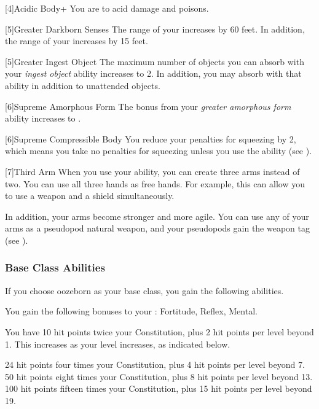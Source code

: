             [4]{Acidic Body+} You are  to acid damage and poisons.

            [5]{Greater Darkborn Senses} The range of your  increases by 60 feet.
            In addition, the range of your  increases by 15 feet.

            [5]{Greater Ingest Object} The maximum number of objects you can absorb with your \textit{ingest object} ability increases to 2.
            In addition, you may absorb  with that ability in addition to unattended objects.

            [6]{Supreme Amorphous Form} The bonus from your \textit{greater amorphous form} ability increases to .

            [6]{Supreme Compressible Body} You reduce your penalties for squeezing by 2, which means you take no penalties for squeezing unless you use the  ability (see ).

            [7]{Third Arm} When you use your  ability, you can create three arms instead of two.
            You can use all three hands as free hands.
            For example, this can allow you to use a  weapon and a shield simultaneously.

            In addition, your arms become stronger and more agile.
            You can use any of your arms as a pseudopod natural weapon, and your pseudopods gain the  weapon tag (see ).

        \subsubsection{Base Class Abilities}
            If you choose oozeborn as your base class, you gain the following abilities.

            You gain the following bonuses to your :  Fortitude,  Reflex,  Mental.

                You have 10 hit points \add twice your Constitution, plus 2 hit points per level beyond 1.
                This increases as your level increases, as indicated below.
                \begin{itemize}
                     24 hit points \add four times your Constitution, plus 4 hit points per level beyond 7.
                     50 hit points \add eight times your Constitution, plus 8 hit points per level beyond 13.
                     100 hit points \add fifteen times your Constitution, plus 15 hit points per level beyond 19.
                \end{itemize}

